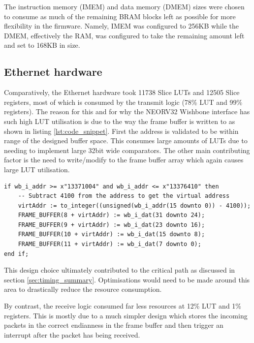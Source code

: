 The instruction memory (IMEM) and data memory (DMEM) sizes were chosen to consume as much of the remaining BRAM blocks left as possible for more flexibility in the firmware. Namely, IMEM was configured to 256KB while the DMEM, effectively the RAM, was configured to take the remaining amount left and set to 168KB in size. 





\subsection{Ethernet hardware}
\label{sec:eth_hardware_util}


Comparatively, the Ethernet hardware took 11738 Slice LUTs and 12505 Slice registers, most of which is consumed by the transmit logic (78\% LUT and 99\%  registers). The reason for this and for why the NEORV32 Wishbone interface has such high LUT utilisation is due to the way the frame buffer is written to as shown in listing \ref{lst:code_snippet}. First the address is validated to be within range of the designed buffer space. This consumes large amounts of LUTs due to needing to implement large 32bit wide comparators. The other main contributing factor is the need to write/modify to the frame buffer array which again causes large LUT utilisation.

\begin{lstlisting}[style=vhdl, caption={Code for writing to the frame buffer}, label=lst:code_snippet]
if wb_i_addr >= x"13371004" and wb_i_addr <= x"13376410" then         
    -- Subtract 4100 from the address to get the virtual address
    virtAddr := to_integer((unsigned(wb_i_addr(15 downto 0)) - 4100));
    FRAME_BUFFER(8 + virtAddr) := wb_i_dat(31 downto 24);
    FRAME_BUFFER(9 + virtAddr) := wb_i_dat(23 downto 16);
    FRAME_BUFFER(10 + virtAddr) := wb_i_dat(15 downto 8);
    FRAME_BUFFER(11 + virtAddr) := wb_i_dat(7 downto 0);
end if;
\end{lstlisting}

This design choice ultimately contributed to the critical path as discussed in section \ref{sec:timing_summary}. Optimisations would need to be made around this area to drastically reduce the resource consumption.

By contrast, the receive logic consumed far less resources at 12\% LUT and 1\% registers. This is mostly due to a much simpler design which stores the incoming packets in the correct endianness in the frame buffer and then trigger an interrupt after the packet has being received. 

